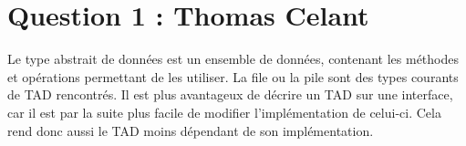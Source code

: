 \section*{Question 1 : Thomas Celant}
Le type abstrait de données est un ensemble de données, contenant les méthodes et opérations permettant de les utiliser. La file ou la pile sont des types courants de TAD rencontrés.
Il est plus avantageux de décrire un TAD sur une interface, car il est par la suite plus facile de modifier l'implémentation de celui-ci. Cela rend donc aussi le TAD moins dépendant de son implémentation.
